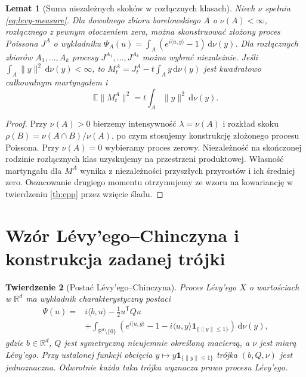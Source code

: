 \documentclass[11pt,a4paper,oneside]{report}
\numberwithin{equation}{chapter}
\theoremstyle{plain}
\newtheorem{twierdzenie}{Twierdzenie}[chapter]
\newtheorem{lemat}[twierdzenie]{Lemat}
\theoremstyle{definition}
\theoremstyle{remark}
\newcommand{\R}{\mathbb{R}}
\newcommand{\E}{\mathbb{E}}
\newcommand{\ind}[1]{\mathbf{1}_{#1}}
\newcommand{\dd}{\mathrm{d}}
\begin{document}
\begin{lemat}[Suma niezależnych skoków w rozłącznych klasach]\label{lem:volIII:10:02}
\label{lem:annular}
Niech $\nu$ spełnia \eqref{eq:levy-measure}. Dla dowolnego
zbioru borelowskiego $A$ o $\nu(A)<\infty$, rozłącznego z
pewnym otoczeniem zera, można skonstruować złożony proces
Poissona $J^A$ o wykładniku
$\Psi_A(u)=\int_A(e^{i\langle u,y\rangle}-1)\,\dd\nu(y)$.
Dla rozłącznych zbiorów $A_1,\ldots,A_k$ procesy
$J^{A_1},\ldots,J^{A_k}$ można wybrać niezależnie.
Jeśli $\int_A\|y\|^2\,\dd\nu(y)<\infty$, to
$M_t^A=J_t^A-t\int_Ay\,\dd\nu(y)$ jest
kwadratowo całkowalnym martyngałem i
\[
\E\|M_t^A\|^2=t\int_A\|y\|^2\,\dd\nu(y).
\]
\end{lemat}
\begin{proof}
Przy $\nu(A)>0$ bierzemy intensywność
$\lambda=\nu(A)$ i rozkład skoku
$\rho(B)=\nu(A\cap B)/\nu(A)$, po czym stosujemy
konstrukcję złożonego procesu Poissona. Przy $\nu(A)=0$
wybieramy proces zerowy. Niezależność na skończonej rodzinie
rozłącznych klas uzyskujemy na przestrzeni produktowej.
Własność martyngału dla $M^A$ wynika z niezależności
przyszłych przyrostów i ich średniej zero.
Oszacowanie drugiego momentu otrzymujemy ze wzoru na
kowariancję w twierdzeniu \ref{th:cpp} przez wzięcie śladu.
\end{proof}

\section{Wzór Lévy'ego--Chinczyna i konstrukcja zadanej trójki}\label{sec:volIII:10:05}

\begin{twierdzenie}[Postać Lévy'ego--Chinczyna]\label{thm:volIII:10:03}
\label{th:LK}
Proces Lévy'ego $X$ o wartościach w $\R^d$ ma wykładnik
charakterystyczny postaci
\[
\begin{split}
\Psi(u)={}&i\langle b,u\rangle-\frac12u^{\mathsf T}Qu\\
&+\int_{\R^d\setminus\{0\}}
\left(e^{i\langle u,y\rangle}-1
-i\langle u,y\rangle\ind{\{\|y\|\le1\}}\right)\,\dd\nu(y),
\end{split}
\tag{10.3}\label{eq:LK}
\]
gdzie $b\in\R^d$, $Q$ jest symetryczną
nieujemnie określoną macierzą, a $\nu$ jest miarą
Lévy'ego. Przy ustalonej funkcji obcięcia
$y\mapsto y\ind{\{\|y\|\le1\}}$ trójka $(b,Q,\nu)$
jest jednoznaczna. Odwrotnie każda taka trójka wyznacza
prawo procesu Lévy'ego.
\end{twierdzenie}
\end{document}
